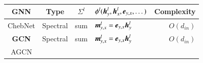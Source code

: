 \begin{table}[H]
    \hspace{-2em}
    \begin{footnotesize}
        \begin{tabular}{cccp{22em}r}
            \toprule
            GNN                                                                                                                       &
            Type                                                                                                                      &
            $\Sigma^l$                                                                                                                  &
            $\phi^l(\boldsymbol{h}^{l}_y, \boldsymbol{h}^l_x, \boldsymbol{e}_{y,x}, \dots)$                                                                                                                    &
            Complexity                                                                                                                  \\ \midrule
            ChebNet \cite{defferrad2016_chebnet}                                                                                      &
            Spectral                                                                                                                  &
            sum                                                                                                                       &
            $\boldsymbol{m}_{y, x}^{l} = \boldsymbol{e}_{y, x}\boldsymbol{h}^{l}_y$                                                          &
            $O(d_{in})$                                                                                                   \\
            \textbf{GCN} \cite{kipf2017_gcn}                                                                                          &
            Spectral                                                                                                                  &
            sum                                                                                                                       &
            $\boldsymbol{m}^l_{y, x} = \boldsymbol{e}_{y, x} \boldsymbol{h}^l_y$                                                                   &
            $O(d_{in})$                                                                                                                 \\
            AGCN \cite{li2018_agcn}                                                                                                   &

\end{tabular}
\end{footnotesize}
\end{table}
